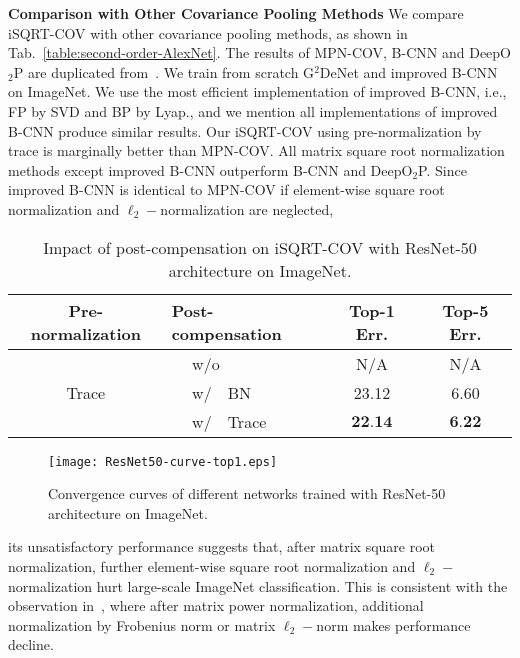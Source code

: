 \documentclass[10pt,twocolumn,letterpaper]{article}
\begin{document}
\vspace{4pt}\noindent\textbf{Comparison with Other Covariance Pooling Methods}\quad 
We compare iSQRT-COV  with other covariance pooling methods, as shown in Tab.~\ref{table:second-order-AlexNet}. The results of MPN-COV, B-CNN and DeepO$_{2}$P are duplicated from~\cite{Li_2017_ICCV}. We train from scratch  G$^2$DeNet and improved B-CNN  on ImageNet. We use the most efficient implementation  of improved B-CNN, i.e., FP by SVD and BP by Lyap., and we mention all implementations of improved B-CNN produce similar results. Our iSQRT-COV using pre-normalization by trace is marginally better than  MPN-COV.  All  matrix square root normalization methods  except improved B-CNN outperform  B-CNN and DeepO$_{2}$P. Since  improved B-CNN is identical to MPN-COV if element-wise square root  normalization and $\ell_{2}-$normalization are neglected, 
\begin{table}[t]
\setlength\tabcolsep{4pt}
	\renewcommand{\baselinestretch}{1.05}
\footnotesize
	\centering
\begin{minipage}[t]{1.0\linewidth}
		\centering
		\begin{tabular}{|c|l|c|c|}
			\hline
			Pre-normalization & Post-compensation & Top-1 Err.   &  Top-5 Err. \\
			\hline
			\hline
			\multirow{3}{*}{Trace} & $\quad\;$w/o       &   N/A    & N/A     \\
			& $\quad\;$w/~~BN~\cite{DBLP:journals/corr/IoffeS15}       &  23.12     & 6.60     \\
			& $\quad\;$w/~~Trace        &  $\textbf{22.14}$ & $\textbf{6.22}$ \\
			\hline
		\end{tabular}
	\end{minipage}
	\renewcommand{\baselinestretch}{1.0}
	\caption{Impact of post-compensation on iSQRT-COV  with  ResNet-50 architecture on ImageNet.}
	\label{table:Post-compensation}
\end{table}
\begin{figure}[t]
	\setlength\tabcolsep{4pt}
	\footnotesize
	\centering
\begin{minipage}[b]{0.7\linewidth}
		\centering
		\texttt{[image: ResNet50-curve-top1.eps]}
	\end{minipage}
	\caption{Convergence curves of different networks trained  with ResNet-50 architecture on ImageNet.}
	\label{figure:traing-iSQRT-COV}
\end{figure}
its unsatisfactory performance  suggests that,  after matrix square root normalization, further element-wise square root normalization and $\ell_{2}-$normalization hurt large-scale ImageNet classification. This is consistent with the observation in~\cite[Tab. 1]{Li_2017_ICCV}, where after matrix power normalization,  additional normalization by Frobenius norm or matrix $\ell_{2}-$norm makes performance decline. 
\end{document}

